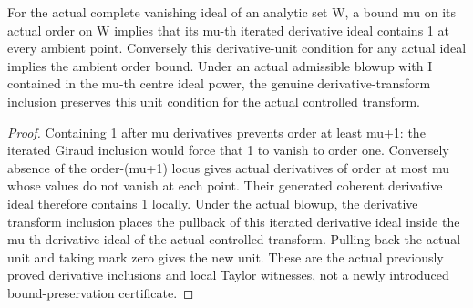 \begin{lemma}
\label{hir:actual-reduced-derivative-bound}
\leanok
For the actual complete vanishing ideal of an analytic set W, a bound
mu on its actual order on W implies that its mu-th iterated derivative
ideal contains 1 at every ambient point. Conversely this derivative-unit
condition for any actual ideal implies the ambient order bound. Under
an actual admissible blowup with I contained in the mu-th centre ideal
power, the genuine derivative-transform inclusion preserves this unit
condition for the actual controlled transform.
\end{lemma}
\begin{proof}
Containing 1 after mu derivatives prevents order at least mu+1: the
iterated Giraud inclusion would force that 1 to vanish to order one.
Conversely absence of the order-(mu+1) locus gives actual derivatives
of order at most mu whose values do not vanish at each point. Their
generated coherent derivative ideal therefore contains 1 locally.
Under the actual blowup, the derivative transform inclusion places the
pullback of this iterated derivative ideal inside the mu-th derivative
ideal of the actual controlled transform. Pulling back the actual unit
and taking mark zero gives the new unit. These are the actual previously
proved derivative inclusions and local Taylor witnesses, not a newly
introduced bound-preservation certificate.
\end{proof}

